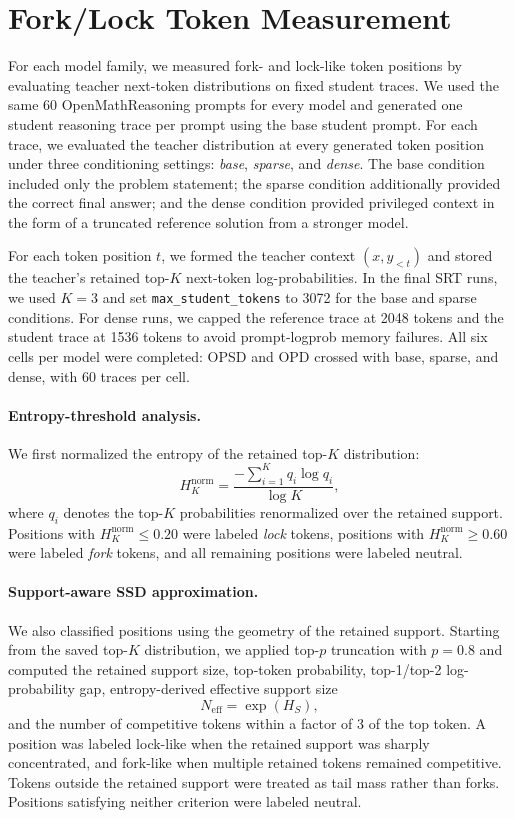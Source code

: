 \section{Fork/Lock Token Measurement}
\label{app:fork-lock-measurement}

For each model family, we measured fork- and lock-like token positions by
evaluating teacher next-token distributions on fixed student traces. We used the
same 60 OpenMathReasoning prompts for every model and generated one student
reasoning trace per prompt using the base student prompt. For each trace, we
evaluated the teacher distribution at every generated token position under three
conditioning settings: \emph{base}, \emph{sparse}, and \emph{dense}. The base
condition included only the problem statement; the sparse condition additionally
provided the correct final answer; and the dense condition provided privileged
context in the form of a truncated reference solution from a stronger model.

For each token position $t$, we formed the teacher context $(x, y_{<t})$ and
stored the teacher's retained top-$K$ next-token log-probabilities. In the final
SRT runs, we used $K=3$ and set \texttt{max\_student\_tokens} to 3072 for the
base and sparse conditions. For dense runs, we capped the reference trace at
2048 tokens and the student trace at 1536 tokens to avoid prompt-logprob memory
failures. All six cells per model were completed: OPSD and OPD crossed with
base, sparse, and dense, with 60 traces per cell.

\paragraph{Entropy-threshold analysis.}
We first normalized the entropy of the retained top-$K$ distribution:
\[
H_K^{\mathrm{norm}}
=
\frac{-\sum_{i=1}^{K} q_i \log q_i}{\log K},
\]
where $q_i$ denotes the top-$K$ probabilities renormalized over the retained
support. Positions with $H_K^{\mathrm{norm}} \le 0.20$ were labeled \emph{lock}
tokens, positions with $H_K^{\mathrm{norm}} \ge 0.60$ were labeled \emph{fork}
tokens, and all remaining positions were labeled neutral.

\paragraph{Support-aware SSD approximation.}
We also classified positions using the geometry of the retained support.
Starting from the saved top-$K$ distribution, we applied top-$p$ truncation with
$p=0.8$ and computed the retained support size, top-token probability,
top-1/top-2 log-probability gap, entropy-derived effective support size
\[
N_{\mathrm{eff}} = \exp(H_S),
\]
and the number of competitive tokens within a factor of 3 of the top token. A
position was labeled lock-like when the retained support was sharply
concentrated, and fork-like when multiple retained tokens remained competitive.
Tokens outside the retained support were treated as tail mass rather than forks.
Positions satisfying neither criterion were labeled neutral.

